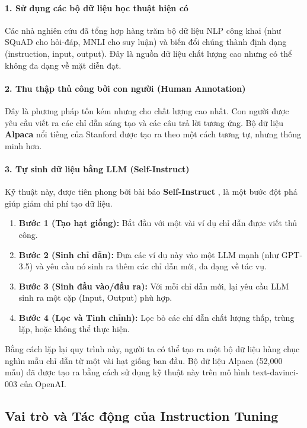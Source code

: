 \paragraph{1. Sử dụng các bộ dữ liệu học thuật hiện có}
Các nhà nghiên cứu đã tổng hợp hàng trăm bộ dữ liệu NLP công khai (như SQuAD cho hỏi-đáp, MNLI cho suy luận) và biến đổi chúng thành định dạng (instruction, input, output). Đây là nguồn dữ liệu chất lượng cao nhưng có thể không đa dạng về mặt diễn đạt.

\paragraph{2. Thu thập thủ công bởi con người (Human Annotation)}
Đây là phương pháp tốn kém nhưng cho chất lượng cao nhất. Con người được yêu cầu viết ra các chỉ dẫn sáng tạo và các câu trả lời tương ứng. Bộ dữ liệu \textbf{Alpaca} nổi tiếng của Stanford \cite{alpaca} được tạo ra theo một cách tương tự, nhưng thông minh hơn.

\paragraph{3. Tự sinh dữ liệu bằng LLM (Self-Instruct)}
Kỹ thuật này, được tiên phong bởi bài báo \textbf{Self-Instruct} \cite{wang2022selfinstruct}, là một bước đột phá giúp giảm chi phí tạo dữ liệu.
\begin{enumerate}
    \item \textbf{Bước 1 (Tạo hạt giống):} Bắt đầu với một vài ví dụ chỉ dẫn được viết thủ công.
    \item \textbf{Bước 2 (Sinh chỉ dẫn):} Đưa các ví dụ này vào một LLM mạnh (như GPT-3.5) và yêu cầu nó sinh ra thêm các chỉ dẫn mới, đa dạng về tác vụ.
    \item \textbf{Bước 3 (Sinh đầu vào/đầu ra):} Với mỗi chỉ dẫn mới, lại yêu cầu LLM sinh ra một cặp (Input, Output) phù hợp.
    \item \textbf{Bước 4 (Lọc và Tinh chỉnh):} Lọc bỏ các chỉ dẫn chất lượng thấp, trùng lặp, hoặc không thể thực hiện.
\end{enumerate}
Bằng cách lặp lại quy trình này, người ta có thể tạo ra một bộ dữ liệu hàng chục nghìn mẫu chỉ dẫn từ một vài hạt giống ban đầu. Bộ dữ liệu Alpaca (52,000 mẫu) đã được tạo ra bằng cách sử dụng kỹ thuật này trên mô hình text-davinci-003 của OpenAI.

\subsection{Vai trò và Tác động của Instruction Tuning}
\label{ssec:instruction_tuning_impact}

